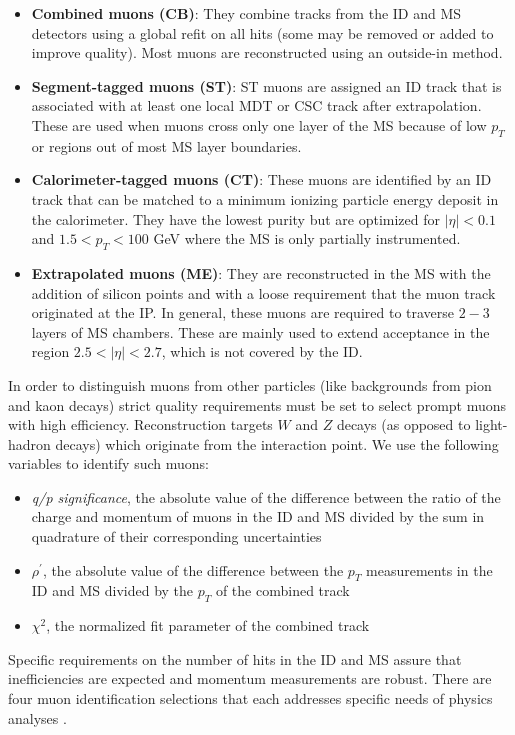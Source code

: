 \begin{itemize}
\item \textbf{Combined muons (CB)}: They combine tracks from the ID and MS detectors using a global refit on all hits (some may be removed or added to improve quality). Most muons are reconstructed using an outside-in method. 
\item \textbf{Segment-tagged muons (ST)}: ST muons are assigned an ID track that is associated with at least one local MDT or CSC track after extrapolation. These are used when muons cross only one layer of the MS because of low $p_T$ or regions out of most MS layer boundaries. 
\item \textbf{Calorimeter-tagged muons (CT)}: These muons are identified by an ID track that can be matched to a minimum ionizing particle energy deposit in the calorimeter. They have the lowest purity but are optimized for $|\eta|  < 0.1$ and $1.5 < p_T < 100$ GeV where the MS is only partially instrumented. 
\item \textbf{Extrapolated muons (ME)}: They are reconstructed in the MS with the addition of silicon points and with a loose requirement that the muon track originated at the IP. In general, these muons are required to traverse $2-3$ layers of MS chambers. These are mainly used to extend acceptance in the region $2.5 < |\eta| < 2.7$, which is not covered by the ID. 
\end{itemize}

In order to distinguish muons from other particles (like backgrounds from pion and kaon decays) strict quality requirements must be set to select prompt muons with high efficiency. Reconstruction targets $W$ and $Z$ decays (as opposed to light-hadron decays) which originate from the interaction point. We use the following variables to identify such muons:
\begin{itemize}
\item \textit{q/p significance}, the absolute value of the difference between the ratio of the charge and momentum of muons in the ID and MS divided by the sum in quadrature of their corresponding uncertainties
\item \textit{$\rho^\prime$}, the absolute value of the difference between the $p_T$ measurements in the ID and MS divided by the $p_T$ of the combined track 
\item \textit{$\chi ^2$}, the normalized fit parameter of the combined track
\end{itemize}

Specific requirements on the number of hits in the ID and MS assure that inefficiencies are expected and momentum measurements are robust. There are four muon identification selections that each addresses specific needs of physics analyses \cite{MCPpaper}.

